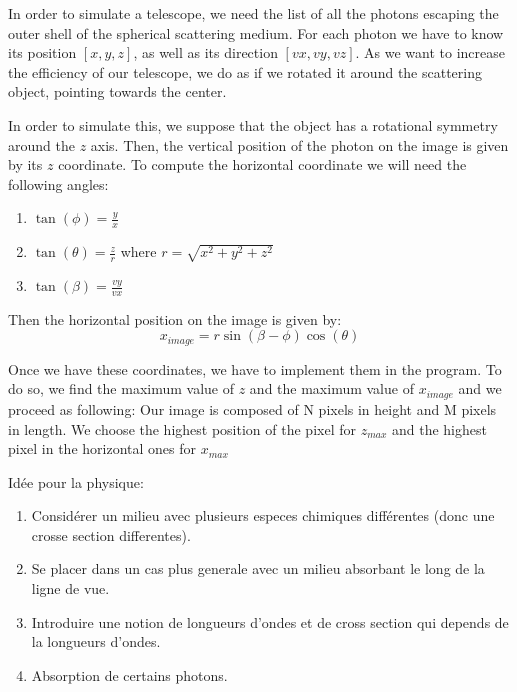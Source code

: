 \documentclass[10pt,a4paper,oneside]{article}
\begin{document}
\begin{multicols}{2}
\quad In order to simulate a telescope, we need the list of all the photons escaping the outer shell of the spherical scattering medium. 
For each photon we have to know its position $[x,y,z]$, as well as its direction $[vx, vy, vz]$.
As we want to increase the efficiency of our telescope, we do as if we rotated it around the scattering object, pointing towards the center. 

In order to simulate this, we suppose that the object has a rotational symmetry around the $z$ axis. Then, the vertical position of the photon on the image is given by its $z$ coordinate. To compute the horizontal coordinate we will need the following angles: 
\begin{enumerate}
    \item $\tan(\phi)=\frac{y}{x}$
    \item $\tan(\theta)=\frac{z}{r}$ where $r=\sqrt{x^2+y^2+z^2}$
    \item $\tan(\beta)=\frac{vy}{vx}$
\end{enumerate}

Then the horizontal position on the image is given by: 
$$x_{image}=r\sin(\beta-\phi)\cos(\theta)$$

Once we have these coordinates, we have to implement them in the program. 
To do so, we find the maximum value of $z$ and the maximum value of $x_{image}$ and we proceed as following: Our image is composed of N pixels in height and M pixels in length. We choose the highest position of the pixel for $z_{max}$ and the highest pixel in the horizontal ones for $x_{max}$



Idée pour la physique: 
\begin{enumerate}
    \item Considérer un milieu avec plusieurs especes chimiques différentes (donc une crosse section differentes).
    
    \item Se placer dans un cas plus generale avec un milieu absorbant le long de la ligne de vue. 
    
    \item Introduire une notion de longueurs d'ondes et de cross section qui depends de la longueurs d'ondes.
    
    \item Absorption de certains photons. 
    
    
\end{enumerate}
 



\end{multicols}
\end{document}
